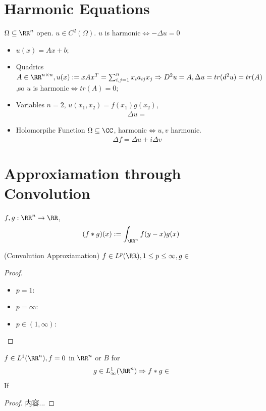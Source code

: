 \documentclass[Total.tex]{subfiles}
\begin{document}
		\section{Harmonic Equations}
			\begin{Def}
				$\Omega\subseteq \RR^n$ open. $u\in C^2(\Omega)$. $u$ is harmonic$\Leftrightarrow -\Delta u=0$ 
			\end{Def}
			\begin{example}
				\begin{itemize}
					\item $u(x)=Ax+b$;
					\item Quadrics $A\in \RR^{n\times n},u(x):=xAx^T=\sum_{i,j=1}^n x_i a_{ij}x_j\Rightarrow D^2u=A,\Delta u=tr(d^2 u)=tr(A)$,so $u$ is harmonic$\Leftrightarrow tr(A)=0$;
					\item Variables $n=2$, $u(x_1,x_2)=f(x_1)g(x_2)$,
					\begin{gather*}
						\Delta u=
					\end{gather*}
					\item Holomorpihc Function $\Omega\subseteq \CC$, harmonic$\Leftrightarrow u,v$ harmonic.
					\begin{gather*}
						\Delta f=\Delta u+i\Delta v
					\end{gather*}
				\end{itemize}
			\end{example}
		\section{Approxiamation through Convolution}
			\begin{Def}
				$f,g:\RR^n\rightarrow \RR$,
				\begin{gather*}
					(f*g)(x):=\int_{\RR^n} f(y-x)g(x)
				\end{gather*}
			\end{Def}
			\begin{lemma}
				(Convolution Approxiamation) $f\in L^p(\RR),1\leq p\leq \infty,g\in $
			\end{lemma}
			\begin{proof}
				\begin{itemize}
					\item $p=1$:
					\item $p=\infty$:
					\item $p\in (1,\infty)$:
				\end{itemize}
			\end{proof}
			
			\begin{lemma}
				$f\in L^1(\RR^n),f=0$ in $\RR^n$ or $B$ for 
				\begin{gather*}
					g\in L^1_\infty(\RR^n)\Rightarrow f*g\in 
				\end{gather*}
				If 
			\end{lemma}
			\begin{proof}
				内容...
			\end{proof}
			
\end{document}
